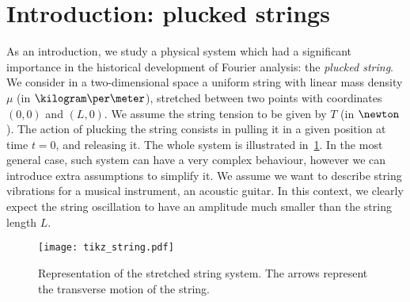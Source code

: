 \section{Introduction: plucked strings}
As an introduction, we study a physical system which had a significant importance in the
historical development of Fourier analysis: the \emph{plucked string}. We consider in a
two-dimensional space a uniform string with linear mass density $\mu$ (in
$\kilogram\per\meter$), stretched between two points with coordinates $(0,0)$ and $(L,0)$.
We assume the string tension to be given by $T$ (in $\newton$). The action of plucking the
string consists in pulling it in a given position at time $t=0$, and releasing it. The
whole system is illustrated in~\cref{fig:string}. In the most general case, such system
can have a very complex behaviour, however we can introduce extra assumptions to simplify
it. We assume we want to describe string vibrations for a musical instrument, \eg an
acoustic guitar. In this context, we clearly expect the string oscillation to have an
amplitude much smaller than the string length $L$.
\begin{figure}[t]
  \centering
  \texttt{[image: tikz\_string.pdf]}
  \caption{Representation of the stretched string system. The arrows represent the transverse motion of the string.}
  \label{fig:string}
\end{figure}
